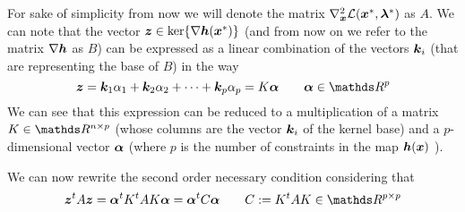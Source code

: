 		For sake of simplicity from now we will denote the matrix $\nabla_{\boldsymbol{x}}^2\mathcal L(\boldsymbol{x}^*,\boldsymbol{\lambda}^*)$ as $A$. We can note that the vector $\boldsymbol{z} \in \ker\{\nabla \boldsymbol{h}(\boldsymbol{x}^*)\}$ (and from now on we refer to the matrix $\nabla \boldsymbol{h}$ as $B$) can be expressed as a linear combination of the vectors $\boldsymbol{k}_i$ (that are representing the base of $B$) in the way
		\[ \vett z = \vett k_1 \alpha_1 + \vett k_2 \alpha_2 + \dots + \vett k_p \alpha_p = K \vett \alpha \qquad \vett \alpha \in \R^p \]
		We can see that this expression can be reduced to a multiplication of a matrix $K \in \R^{n\times p}$ (whose columns are the vector $\boldsymbol{k}_i$ of the kernel base) and a $p$-dimensional vector $\boldsymbol{\alpha}$ (where $p$ is the number of constraints in the map $\boldsymbol{h}(\boldsymbol{x})$ ).
		
		We can now rewrite the second order necessary condition considering that
		\[ \vett z^t A \vett z = \vett \alpha^t K^t A K \vett \alpha = \vett \alpha^t C \vett \alpha  \qquad C := K^tAK \in \R^{p\times p} \]
		
